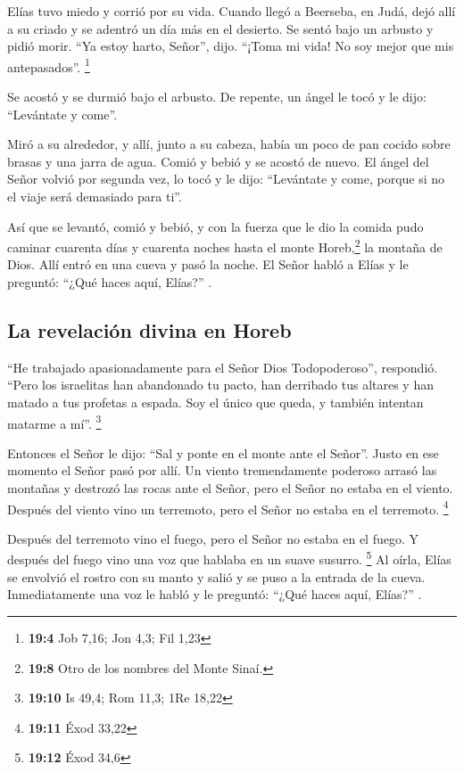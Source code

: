  Elías tuvo miedo y corrió por su vida. Cuando llegó a
Beerseba, en Judá, dejó allí a su criado  y se adentró un
día más en el desierto. Se sentó bajo un arbusto y pidió morir. ``Ya
estoy harto, Señor'', dijo. ``¡Toma mi vida! No soy mejor que mis
antepasados''. \footnote{\textbf{19:4} Job 7,16; Jon 4,3; Fil 1,23}

 Se acostó y se durmió bajo el arbusto. De repente, un
ángel le tocó y le dijo: ``Levántate y come''.

 Miró a su alrededor, y allí, junto a su cabeza, había un
poco de pan cocido sobre brasas y una jarra de agua. Comió y bebió y se
acostó de nuevo.  El ángel del Señor volvió por segunda
vez, lo tocó y le dijo: ``Levántate y come, porque si no el viaje será
demasiado para ti''.

 Así que se levantó, comió y bebió, y con la fuerza que le
dio la comida pudo caminar cuarenta días y cuarenta noches hasta el
monte Horeb,\footnote{\textbf{19:8} Otro de los nombres del Monte Sinaí.}
la montaña de Dios.  Allí entró en una cueva y pasó la
noche. El Señor habló a Elías y le preguntó: ``¿Qué haces aquí, Elías?''
.

\hypertarget{la-revelaciuxf3n-divina-en-horeb}{%
\subsection{La revelación divina en
Horeb}\label{la-revelaciuxf3n-divina-en-horeb}}

 ``He trabajado apasionadamente para el Señor Dios
Todopoderoso'', respondió. ``Pero los israelitas han abandonado tu
pacto, han derribado tus altares y han matado a tus profetas a espada.
Soy el único que queda, y también intentan matarme a mí''. \footnote{\textbf{19:10}
  Is 49,4; Rom 11,3; 1Re 18,22}

 Entonces el Señor le dijo: ``Sal y ponte en el monte
ante el Señor''. Justo en ese momento el Señor pasó por allí. Un viento
tremendamente poderoso arrasó las montañas y destrozó las rocas ante el
Señor, pero el Señor no estaba en el viento. Después del viento vino un
terremoto, pero el Señor no estaba en el terremoto. \footnote{\textbf{19:11}
  Éxod 33,22}

 Después del terremoto vino el fuego, pero el Señor no
estaba en el fuego. Y después del fuego vino una voz que hablaba en un
suave susurro. \footnote{\textbf{19:12} Éxod 34,6}  Al
oírla, Elías se envolvió el rostro con su manto y salió y se puso a la
entrada de la cueva. Inmediatamente una voz le habló y le preguntó:
``¿Qué haces aquí, Elías?'' .

